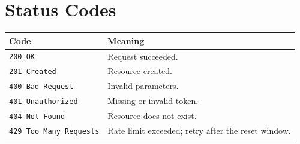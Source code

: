 \documentclass[11pt]{article}
\begin{document}
\section{Status Codes}
\begin{tabularx}{\linewidth}{@{}l X@{}}
\toprule
\textbf{Code} & \textbf{Meaning}\\
\midrule
\texttt{200 OK}          & Request succeeded.\\
\texttt{201 Created}     & Resource created.\\
\texttt{400 Bad Request} & Invalid parameters.\\
\texttt{401 Unauthorized}& Missing or invalid token.\\
\texttt{404 Not Found}   & Resource does not exist.\\
\texttt{429 Too Many Requests} & Rate limit exceeded; retry after the reset window.\\
\bottomrule
\end{tabularx}
\end{document}
